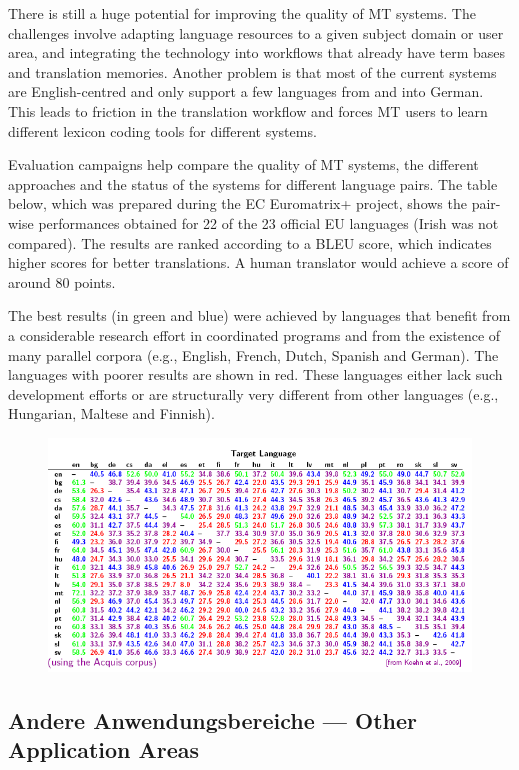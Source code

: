 \documentclass[]{../../metanetpaper}
\begin{document}
\begin{Parallel}[c]{80mm}{80mm}
{There is still a huge potential for improving the quality of MT systems. The challenges involve adapting language resources to a given subject domain or user area, and integrating the technology into workflows that already have term bases and translation memories. Another problem is that most of the current systems are English-centred and only support a few languages from and into German. This leads to friction in the translation workflow and forces MT users to learn different lexicon coding tools for different systems.

Evaluation campaigns help compare the quality of MT systems, the different approaches and the status of the systems for different language pairs. The table below, which was prepared during the EC Euromatrix+ project, shows the pair-wise performances obtained for 22 of the 23 official EU languages (Irish was not compared). The results are ranked according to a BLEU score, which indicates higher scores for better translations\cite{bleu1}. A human translator would achieve a score of around 80 points.

The best results (in green and blue) were achieved by languages that benefit from a considerable research effort in coordinated programs and from the existence of many parallel corpora (e.g., English, French, Dutch, Spanish and German). The languages with poorer results are shown in red. These languages either lack such development efforts or are structurally very different from other languages (e.g., Hungarian, Maltese and Finnish).


  }  
  \ParallelPar

\begin{figure}[h!]
\center
\includegraphics[scale=0.6]{../_media/grit}
 \end{figure}

  
  \subsection{Andere Anwendungsbereiche --- Other Application Areas}


\end{Parallel}
\end{document}
